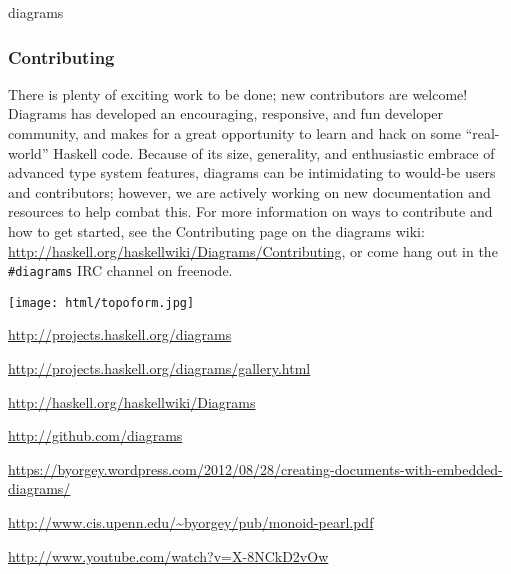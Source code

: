 \begin{hcarentry}[updated]{diagrams}
\subsubsection*{Contributing}

There is plenty of exciting work to be done; new contributors are
welcome!  Diagrams has developed an encouraging, responsive, and fun
developer community, and makes for a great opportunity to learn and
hack on some ``real-world'' Haskell code.  Because of its size,
generality, and enthusiastic embrace of advanced type system features,
diagrams can be intimidating to would-be users and contributors;
however, we are actively working on new documentation and resources to
help combat this.  For more information on ways to contribute and how
to get started, see the Contributing page on the diagrams wiki:
\url{http://haskell.org/haskellwiki/Diagrams/Contributing}, or come
hang out in the \texttt{\#diagrams} IRC channel on freenode.

\begin{center}
\texttt{[image: html/topoform.jpg]}
\end{center}

\FurtherReading
\begin{compactitem}
\item \url{http://projects.haskell.org/diagrams}
\item \url{http://projects.haskell.org/diagrams/gallery.html}
\item \url{http://haskell.org/haskellwiki/Diagrams}
\item \url{http://github.com/diagrams}
\item \url{https://byorgey.wordpress.com/2012/08/28/creating-documents-with-embedded-diagrams/}
\item \url{http://www.cis.upenn.edu/~byorgey/pub/monoid-pearl.pdf}
\item \url{http://www.youtube.com/watch?v=X-8NCkD2vOw}
\end{compactitem}
\end{hcarentry}
